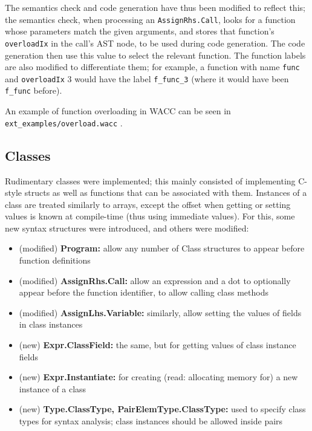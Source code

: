 \documentclass{article}
\begin{document}
The semantics check and code generation have thus been modified to reflect this; the semantics check, when processing an \texttt{AssignRhs.Call}, looks for a function whose parameters match the given arguments, and stores that function's \texttt{overloadIx} in the call's AST node, to be used during code generation. The code generation then use this value to select the relevant function. The function labels are also modified to differentiate them; for example, a function with name \texttt{func} and \texttt{overloadIx} 3 would have the label \texttt{f_func_3} (where it would have been \texttt{f_func} before).

An example of function overloading in WACC can be seen in \texttt{ext_examples/overload.wacc} .

\subsection{Classes}

Rudimentary classes were implemented; this mainly consisted of implementing C-style structs as well as functions that can be associated with them. Instances of a class are treated similarly to arrays, except the offset when getting or setting values is known at compile-time (thus using immediate values). For this, some new syntax structures were introduced, and others were modified:

\begin{itemize}
    \item (modified) \textbf{Program:} allow any number of Class structures to appear before function definitions
    \item (modified) \textbf{AssignRhs.Call:} allow an expression and a dot to optionally appear before the function identifier, to allow calling class methods
    \item (modified) \textbf{AssignLhs.Variable:} similarly, allow setting the values of fields in class instances
    \item (new) \textbf{Expr.ClassField:} the same, but for getting values of class instance fields
    \item (new) \textbf{Expr.Instantiate:} for creating (read: allocating memory for) a new instance of a class
    \item (new) \textbf{Type.ClassType, PairElemType.ClassType:} used to specify class types for syntax analysis; class instances should be allowed inside pairs
\end{itemize}
\end{document}

